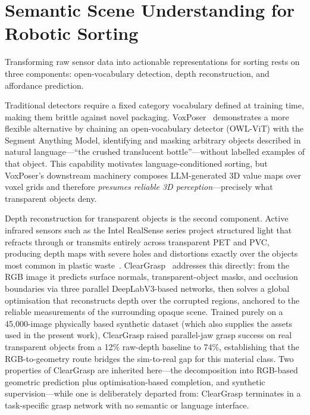 \section{Semantic Scene Understanding for Robotic Sorting}
\label{sec:lit_scene}

Transforming raw sensor data into actionable representations for sorting rests on three components: open-vocabulary detection, depth reconstruction, and affordance prediction.

Traditional detectors require a fixed category vocabulary defined at training time, making them brittle against novel packaging. VoxPoser~\citep{huang2023} demonstrates a more flexible alternative by chaining an open-vocabulary detector (OWL-ViT) with the Segment Anything Model, identifying and masking arbitrary objects described in natural language---``the crushed translucent bottle''---without labelled examples of that object. This capability motivates language-conditioned sorting, but VoxPoser's downstream machinery composes LLM-generated 3D value maps over voxel grids and therefore \emph{presumes reliable 3D perception}---precisely what transparent objects deny.

Depth reconstruction for transparent objects is the second component. Active infrared sensors such as the Intel RealSense series project structured light that refracts through or transmits entirely across transparent PET and PVC, producing depth maps with severe holes and distortions exactly over the objects most common in plastic waste~\citep{sajjan2020}. ClearGrasp~\citep{sajjan2020} addresses this directly: from the RGB image it predicts surface normals, transparent-object masks, and occlusion boundaries via three parallel DeepLabV3-based networks, then solves a global optimisation that reconstructs depth over the corrupted regions, anchored to the reliable measurements of the surrounding opaque scene. Trained purely on a 45{,}000-image physically based synthetic dataset (which also supplies the assets used in the present work), ClearGrasp raised parallel-jaw grasp success on real transparent objects from a 12\% raw-depth baseline to 74\%, establishing that the RGB-to-geometry route bridges the sim-to-real gap for this material class. Two properties of ClearGrasp are inherited here---the decomposition into RGB-based geometric prediction plus optimisation-based completion, and synthetic supervision---while one is deliberately departed from: ClearGrasp terminates in a task-specific grasp network with no semantic or language interface.

